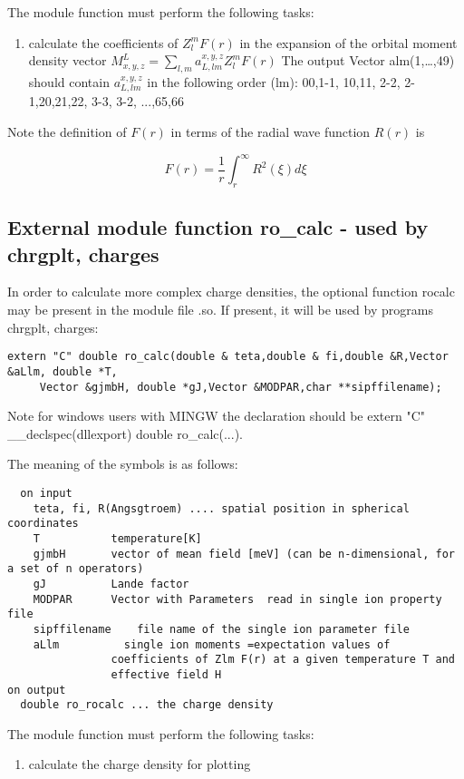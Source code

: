 The module function must perform the following tasks:
\begin{enumerate}
\item calculate the coefficients of $Z_l^m F(r)$ in the expansion of
      the orbital moment
      density vector $M^L_{x,y,z}=\sum_{l,m} a^{x,y,z}_{L,lm} Z_l^m F(r)$
      The output Vector alm(1,\dots,49) should contain  $a^{x,y,z}_{L,lm}$
      in the following order (lm):  00,1-1, 10,11, 2-2, 2-1,20,21,22, 3-3, 3-2, ...,65,66
\end{enumerate}

Note the definition of $F(r)$ in terms of the radial wave function $R(r)$ is

\begin{equation}
F(r)=\frac{1}{r}\int_r^{\infty} R^2(\xi)d\xi
\end{equation}

\subsection{External module function {\prg ro\_calc} -
used by {\prg chrgplt},
{\prg charges}
}

In order to calculate more complex charge densities, the optional function
{\prg rocalc} may be present in the module file {\prg *.so}. If present,
it will be used by programs {\prg chrgplt},
{\prg charges}:

\begin{verbatim}
extern "C" double ro_calc(double & teta,double & fi,double &R,Vector &aLlm, double *T,
     Vector &gjmbH, double *gJ,Vector &MODPAR,char **sipffilename);
\end{verbatim}

Note for windows users with MINGW the declaration should be {\prg extern "C" \_\_declspec(dllexport) double %
ro\_calc(...)}.

The meaning of the symbols is as follows:
{\footnotesize
\begin{verbatim}
  on input
    teta, fi, R(Angsgtroem) .... spatial position in spherical coordinates
    T           temperature[K]
    gjmbH       vector of mean field [meV] (can be n-dimensional, for a set of n operators)
    gJ          Lande factor
    MODPAR      Vector with Parameters  read in single ion property file
    sipffilename    file name of the single ion parameter file
    aLlm          single ion moments =expectation values of
                coefficients of Zlm F(r) at a given temperature T and
                effective field H
on output
  double ro_rocalc ... the charge density
\end{verbatim}
}

The module function must perform the following tasks:
\begin{enumerate}
\item calculate the charge density for plotting
\end{enumerate}


